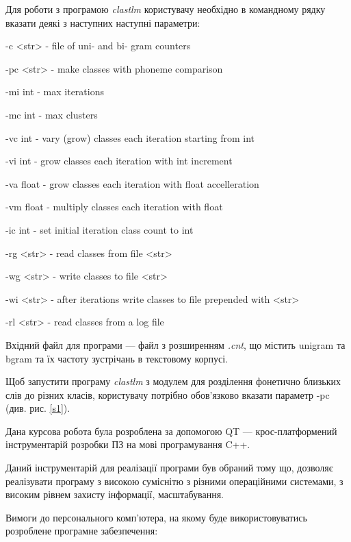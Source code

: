 \documentclass{diploma}
\begin{document}
 Для роботи з програмою \emph{clastlm} користувачу необхідно в командному рядку вказати деякі з наступних наступні параметри:
 \begin{itemizer}
\item -c <str> - file of uni- and bi- gram counters
\item -pc <str> - make classes with phoneme comparison
\item -mi int - max iterations
\item -mc int - max clusters
\item -vc int - vary (grow) classes each iteration starting from int
\item -vi int - grow classes each iteration with int increment
\item -va float - grow classes each iteration with float accelleration
\item -vm float - multiply classes each iteration with float
\item -ic int - set initial iteration class count to int
\item -rg <str> - read classes from file <str>
\item -wg <str> - write classes to file <str>
\item -wi <str> - after iterations write classes to file prepended with <str>
\item -rl <str> - read classes from a log file
 \end{itemizer}
 Вхідний файл для програми --- файл з розширенням \emph{.cnt}, що містить unigram та bgram та їх частоту зустрічань в текстовому корпусі.
 
 Щоб запустити програму \emph{clastlm} з модулем для розділення фонетично близьких слів до різних класів, користувачу потрібно обов'язково вказати параметр -pc (див. рис. \ref{s1}).
 
 

Дана курсова робота була розроблена за допомогою QT --- крос-платформений інструментарій розробки ПЗ на мові програмування C++. 

Даний інструментарій для реалізації програми був обраний тому що, дозволяє реалізувати програму з високою суміснітю з різними операційними системами, з високим рівнем захисту інформації, масштабування.


Вимоги до персонального комп’ютера, на якому буде використовуватись розроблене програмне забезпечення:
\end{document}
